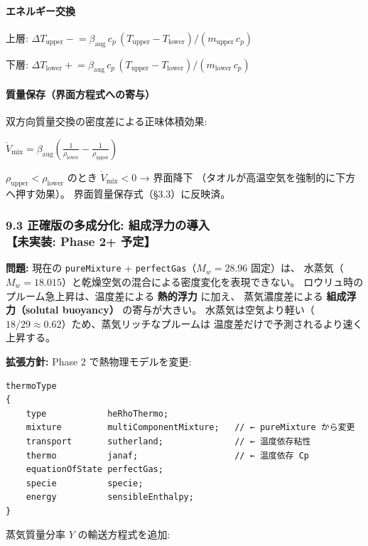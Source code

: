 \documentclass[a4paper,11pt]{article}
\begin{document}
\paragraph{エネルギー交換}
上層: $\Delta T_{\text{upper}} \mathrel{-}= \beta_{\text{aug}} \, c_p \, (T_{\text{upper}} - T_{\text{lower}}) / (m_{\text{upper}} \, c_p)$

下層: $\Delta T_{\text{lower}} \mathrel{+}= \beta_{\text{aug}} \, c_p \, (T_{\text{upper}} - T_{\text{lower}}) / (m_{\text{lower}} \, c_p)$

\paragraph{質量保存（界面方程式への寄与）}
双方向質量交換の密度差による正味体積効果:

$
\dot{V}_{\text{mix}} = \beta_{\text{aug}} \left( \frac{1}{\rho_{\text{lower}}} - \frac{1}{\rho_{\text{upper}}} \right)
$

$\rho_{\text{upper}} < \rho_{\text{lower}}$ のとき $\dot{V}_{\text{mix}} < 0$ → 界面降下
（タオルが高温空気を強制的に下方へ押す効果）。
界面質量保存式（§3.3）に反映済。

\subsubsection{9.3 正確版の多成分化: 組成浮力の導入 \textnormal{【未実装: Phase 2+ 予定】}}

\textbf{問題:} 現在の \texttt{pureMixture} + \texttt{perfectGas}（$M_w = 28.96$ 固定）は、
水蒸気（$M_w = 18.015$）と乾燥空気の混合による密度変化を表現できない。
ロウリュ時のプルーム急上昇は、温度差による \textbf{熱的浮力} に加え、
蒸気濃度差による \textbf{組成浮力（solutal buoyancy）} の寄与が大きい。
水蒸気は空気より軽い（$18/29 \approx 0.62$）ため、蒸気リッチなプルームは
温度差だけで予測されるより速く上昇する。

\textbf{拡張方針:} Phase 2 で熱物理モデルを変更:

\begin{verbatim}
thermoType
{
    type            heRhoThermo;
    mixture         multiComponentMixture;   // ← pureMixture から変更
    transport       sutherland;              // ← 温度依存粘性
    thermo          janaf;                   // ← 温度依存 Cp
    equationOfState perfectGas;
    specie          specie;
    energy          sensibleEnthalpy;
}
\end{verbatim}

蒸気質量分率 $Y$ の輸送方程式を追加:
\end{document}

